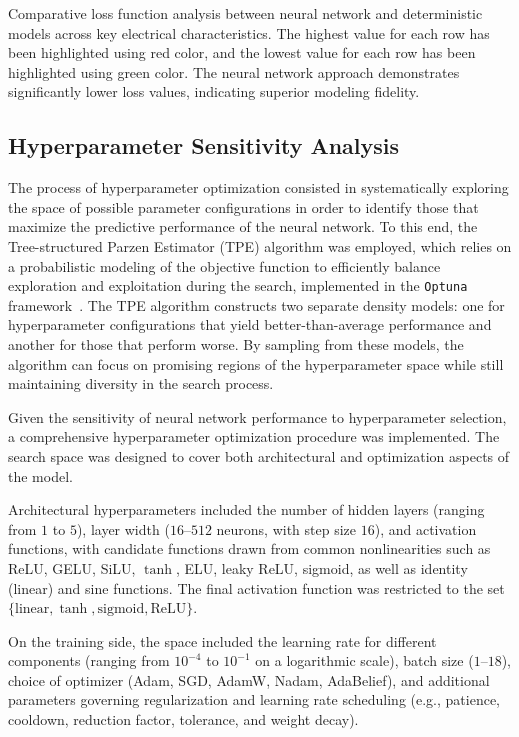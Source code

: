\documentclass[11pt, oneside]{article}
\begin{document}
\begin{table}
    \caption{Comparative loss function analysis between neural network and deterministic models across key electrical characteristics. The highest value for each row has been highlighted using red color, and the lowest value for each row has been highlighted using green color. The neural network approach demonstrates significantly lower loss values, indicating superior modeling fidelity.}
    \label{tab:mms_comp}
\end{table}


\subsection{Hyperparameter Sensitivity Analysis}

The process of hyperparameter optimization consisted in systematically exploring the space of possible parameter configurations in order to identify those that maximize the predictive performance of the neural network. To this end, the Tree-structured Parzen Estimator (TPE) algorithm was employed, which relies on a probabilistic modeling of the objective function to efficiently balance exploration and exploitation during the search, implemented in the \verb|Optuna| framework~\cite{akiba2019optuna}. The TPE algorithm constructs two separate density models: one for hyperparameter configurations that yield better-than-average performance and another for those that perform worse. By sampling from these models, the algorithm can focus on promising regions of the hyperparameter space while still maintaining diversity in the search process.


Given the sensitivity of neural network performance to hyperparameter selection, a comprehensive hyperparameter optimization procedure was implemented. The search space was designed to cover both architectural and optimization aspects of the model.

Architectural hyperparameters included the number of hidden layers (ranging from $1$ to $5$), layer width ($16$--$512$ neurons, with step size $16$), and activation functions, with candidate functions drawn from common nonlinearities such as ReLU, GELU, SiLU, $\tanh$, ELU, leaky ReLU, sigmoid, as well as identity (linear) and sine functions. The final activation function was restricted to the set $\{\text{linear}, \tanh, \text{sigmoid}, \text{ReLU}\}$.

On the training side, the space included the learning rate for different components (ranging from $10^{-4}$ to $10^{-1}$ on a logarithmic scale), batch size ($1$--$18$), choice of optimizer (Adam, SGD, AdamW, Nadam, AdaBelief), and additional parameters governing regularization and learning rate scheduling (e.g., patience, cooldown, reduction factor, tolerance, and weight decay).
\end{document}
